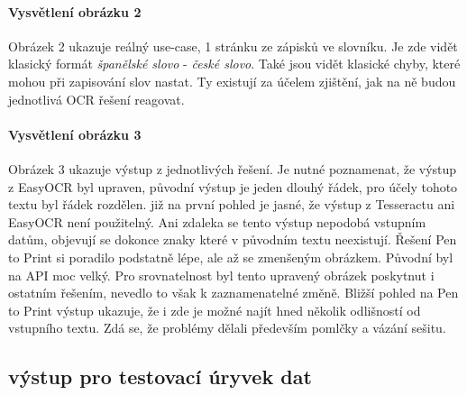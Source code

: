\documentclass[journal]{IEEEtran}
\begin{document}
\paragraph{Vysvětlení obrázku 2}
Obrázek 2 ukazuje reálný use-case, 1 stránku ze zápisků ve slovníku.
Je zde vidět klasický formát \textit{španělské slovo} - \textit{české slovo}.
Také jsou vidět klasické chyby, které mohou při zapisování slov nastat.
Ty existují za účelem zjištění, jak na ně budou jednotlivá \ac{OCR} řešení reagovat.

\paragraph{Vysvětlení obrázku 3}
Obrázek 3 ukazuje výstup z jednotlivých řešení.
Je nutné poznamenat, že výstup z EasyOCR byl upraven, původní výstup je jeden dlouhý řádek, pro účely tohoto textu byl řádek rozdělen.
již na první pohled je jasné, že výstup z Tesseractu ani EasyOCR není použitelný.
Ani zdaleka se tento výstup nepodobá vstupním datům, objevují se dokonce znaky které v původním textu neexistují.
Řešení Pen to Print si poradilo podstatně lépe, ale až se zmenšeným obrázkem.
Původní byl na \ac{API} moc velký.
Pro srovnatelnost byl tento upravený obrázek poskytnut i ostatním řešením, nevedlo to však k zaznamenatelné změně.
Bližší pohled na Pen to Print výstup ukazuje, že i zde je možné najít hned několik odlišností od vstupního textu.
Zdá se, že problémy dělali především pomlčky a vázání sešitu.

\subsection{výstup pro testovací úryvek dat}
\end{document}
